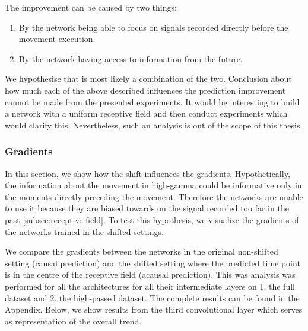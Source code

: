 The improvement can be caused by two things:
\begin{enumerate}
    \item By the network being able to focus on signals recorded directly before the movement execution.
    \item By the network having access to information from the future.
\end{enumerate}

We hypothesise that is most likely a combination of the two.
Conclusion about how much each of the above described influences the prediction improvement cannot be made from the presented experiments.
It would be interesting to build a network with a uniform receptive field and then conduct experiments which would clarify this.
Nevertheless, such an analysis is out of the scope of this thesis.

\subsubsection{Gradients}
In this section, we show how the shift influences the gradients.
Hypothetically, the information about the movement in high-gamma could be informative only in the moments directly preceding the movement.
Therefore the networks are unable to use it because they are biased towards on the signal recorded too far in the past \ref{subsec:receptive-field}.
To test this hypothesis, we visualize the gradients of the networks trained in the shifted settings.

We compare the gradients between the networks in the original non-shifted setting (causal prediction) and the shifted setting where the predicted time point is in the centre of the receptive field (acausal prediction).
This was analysis was performed for all the architectures for all their intermediate layers on 1. the full dataset and 2. the high-passed dataset.
The complete results can be found in the Appendix.
Below, we show results from the third convolutional layer which serves as representation of the overall trend. 

